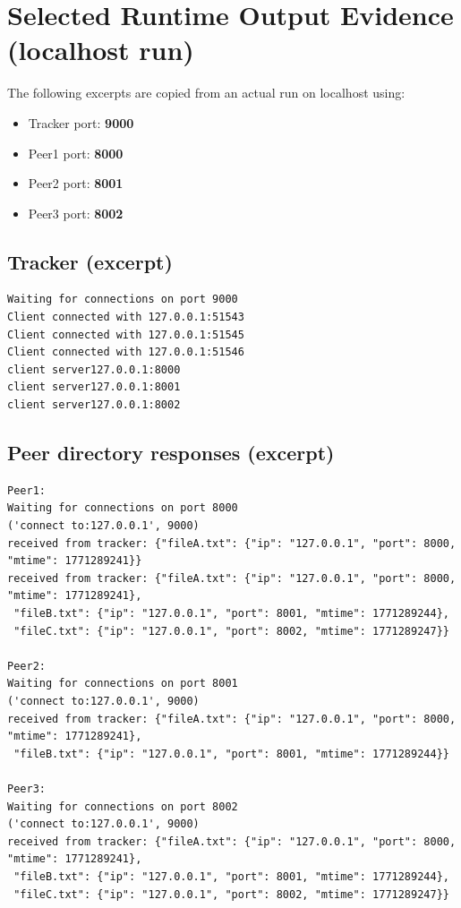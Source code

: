 \documentclass[11pt]{article}
\begin{document}
\section{Selected Runtime Output Evidence (localhost run)}
The following excerpts are copied from an actual run on localhost using:
\begin{itemize}[noitemsep]
  \item Tracker port: \textbf{9000}
  \item Peer1 port: \textbf{8000}
  \item Peer2 port: \textbf{8001}
  \item Peer3 port: \textbf{8002}
\end{itemize}

\subsection*{Tracker (excerpt)}
\begin{lstlisting}
Waiting for connections on port 9000
Client connected with 127.0.0.1:51543
Client connected with 127.0.0.1:51545
Client connected with 127.0.0.1:51546
client server127.0.0.1:8000
client server127.0.0.1:8001
client server127.0.0.1:8002
\end{lstlisting}

\subsection*{Peer directory responses (excerpt)}
\begin{lstlisting}
Peer1:
Waiting for connections on port 8000
('connect to:127.0.0.1', 9000)
received from tracker: {"fileA.txt": {"ip": "127.0.0.1", "port": 8000, "mtime": 1771289241}}
received from tracker: {"fileA.txt": {"ip": "127.0.0.1", "port": 8000, "mtime": 1771289241},
 "fileB.txt": {"ip": "127.0.0.1", "port": 8001, "mtime": 1771289244},
 "fileC.txt": {"ip": "127.0.0.1", "port": 8002, "mtime": 1771289247}}

Peer2:
Waiting for connections on port 8001
('connect to:127.0.0.1', 9000)
received from tracker: {"fileA.txt": {"ip": "127.0.0.1", "port": 8000, "mtime": 1771289241},
 "fileB.txt": {"ip": "127.0.0.1", "port": 8001, "mtime": 1771289244}}

Peer3:
Waiting for connections on port 8002
('connect to:127.0.0.1', 9000)
received from tracker: {"fileA.txt": {"ip": "127.0.0.1", "port": 8000, "mtime": 1771289241},
 "fileB.txt": {"ip": "127.0.0.1", "port": 8001, "mtime": 1771289244},
 "fileC.txt": {"ip": "127.0.0.1", "port": 8002, "mtime": 1771289247}}
\end{lstlisting}
\end{document}
